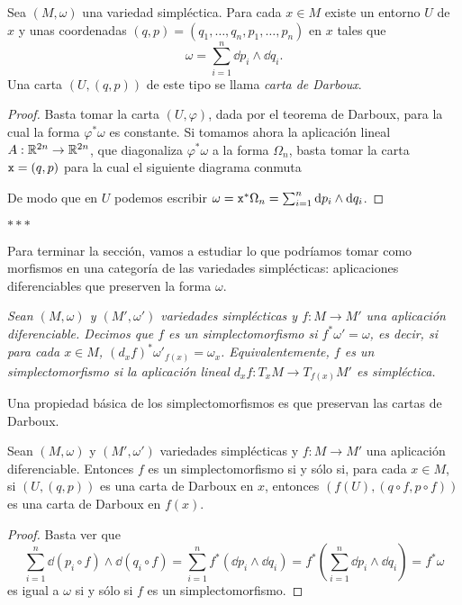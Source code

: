 \begin{corol}
  Sea $(M,\omega)$ una variedad simpléctica. Para cada $x\in M$ existe un entorno $U$ de $x$ y unas coordenadas $(q,p)=(q_1,\dots,q_n,p_1,\dots,p_n)$ en $x$ tales que 
\begin{equation*}
  \omega= \sum_{i=1}^n \dd p_i \wedge \dd q_i.
\end{equation*}
Una carta $(U,(q,p))$ de este tipo se llama \emph{carta de Darboux}.
\end{corol}
\begin{proof}
  Basta tomar la carta $(U,\varphi)$, dada por el teorema de Darboux, para la cual la forma $\varphi^*\omega$ es constante. Si tomamos ahora la aplicación lineal $A:\mathbb{R}^{2n}\rightarrow \mathbb{R}^{2n}$, que diagonaliza $\varphi^*\omega$ a la forma $\Omega_n$, basta tomar la carta $\mathtt{x}=(q,p)$ para la cual el siguiente diagrama conmuta
  \begin{center}
   \end{center}
   De modo que en $U$ podemos escribir $\omega=\mathtt{x}^*\Omega_n=\sum_{i=1}^n \mathrm{d} p_i \wedge \mathrm{d} q_i$.
\end{proof}
  \begin{center}  $\ast\ast\ast$ \end{center}
Para terminar la sección, vamos a estudiar lo que podríamos tomar como morfismos en una categoría de las variedades simplécticas: aplicaciones diferenciables que preserven la forma $\omega$.
\begin{defn}
  \em
  Sean $(M,\omega)$ y $(M',\omega')$ variedades simplécticas y $f:M \rightarrow M'$ una aplicación diferenciable. Decimos que $f$ es un \emph{simplectomorfismo} si
    $f^* \omega' = \omega$,
  es decir, si para cada $x\in M$, $(d_xf)^*\omega'_{f(x)}=\omega_x$. Equivalentemente, $f$ es un simplectomorfismo si la aplicación lineal $d_xf:T_xM \rightarrow T_{f(x)}M'$ es simpléctica.
\end{defn}

Una propiedad básica de los simplectomorfismos es que preservan las cartas de Darboux.
\begin{prop}
  Sean $(M,\omega)$ y $(M',\omega')$ variedades simplécticas y $f:M \rightarrow M'$ una aplicación diferenciable. Entonces $f$ es un simplectomorfismo si y sólo si, para cada $x \in M$, si $(U,(q,p))$ es una carta de Darboux en $x$, entonces $(f(U),(q\circ f, p \circ f))$ es una carta de Darboux en $f(x)$.
\end{prop}
\begin{proof}\leavevmode
Basta ver que
\begin{equation*}
  \sum_{i=1}^n \dd (p_i \circ f) \wedge \dd (q_i \circ f) = \sum_{i=1}^n f^* (\dd p_i \wedge \dd q_i) = f^* \left( \sum_{i=1}^n \dd p_i \wedge \dd q_i \right) = f^* \omega
\end{equation*}
es igual a $\omega$ si y sólo si $f$ es un simplectomorfismo.

\end{proof}

